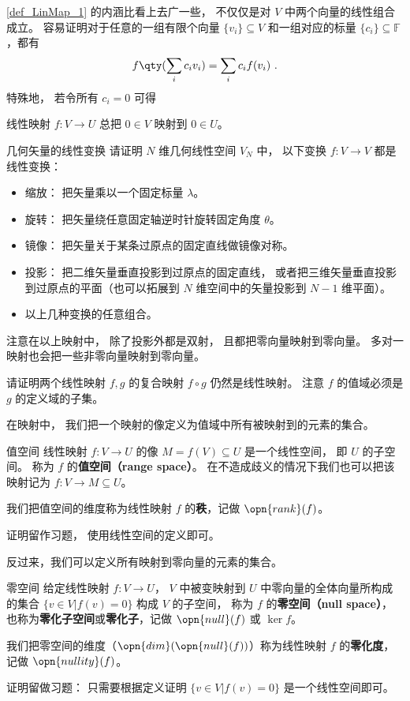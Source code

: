 \autoref{def_LinMap_1} 的内涵比看上去广一些， 不仅仅是对 $V$ 中两个向量的线性组合成立。 容易证明对于任意的一组有限个向量 $\{v_i\}\subseteq V$ 和一组对应的标量 $\{c_i\}\subseteq\mathbb{F}$，都有
\begin{equation}\label{eq_LinMap_1}
f\qty(\sum_i c_i v_i)=\sum_i c_i f(v_i)~.
\end{equation}
特殊地， 若令所有 $c_i = 0$ 可得
\begin{corollary}{}\label{cor_LinMap_1}
线性映射 $f:V\to U$ 总把 $0 \in V$ 映射到 $0 \in U$。
\end{corollary}

\begin{exercise}{几何矢量的线性变换}
请证明 $N$ 维几何线性空间 $V_N$ 中， 以下变换 $f:V\to V$ 都是线性变换：
\begin{itemize}
\item 缩放： 把矢量乘以一个固定标量 $\lambda$。
\item 旋转： 把矢量绕任意固定轴逆时针旋转固定角度 $\theta$。
\item 镜像： 把矢量关于某条过原点的固定直线做镜像对称。
\item 投影： 把二维矢量垂直投影到过原点的固定直线， 或者把三维矢量垂直投影到过原点的平面（也可以拓展到 $N$ 维空间中的矢量投影到 $N-1$ 维平面）。
\item 以上几种变换的任意组合。
\end{itemize}
\end{exercise}
注意在以上映射中， 除了投影外都是双射， 且都把零向量映射到零向量。 多对一映射也会把一些非零向量映射到零向量。

\begin{exercise}{}
请证明两个线性映射 $f, g$ 的复合映射 $f \circ g$ 仍然是线性映射。 注意 $f$ 的值域必须是 $g$ 的定义域的子集。
\end{exercise}

在映射中， 我们把一个映射的像定义为值域中所有被映射到的元素的集合。
\begin{definition}{值空间}\label{def_LinMap_3}
线性映射 $f:V\to U$ 的像 $M = f(V) \subseteq U$ 是一个线性空间， 即 $U$ 的子空间。 称为 $f$ 的\textbf{值空间（range space）}。 在不造成歧义的情况下我们也可以把该映射记为 $f: V\to M \subseteq U$。

我们把值空间的维度称为线性映射 $f$ 的\textbf{秩}，记做 $\opn{rank}(f)$。
\end{definition}
证明留作习题， 使用线性空间的定义即可。

反过来，我们可以定义所有映射到零向量的元素的集合。
\begin{definition}{零空间}\label{def_LinMap_2}
给定线性映射 $f:V\to U$， $V$ 中被变映射到 $U$ 中零向量的全体向量所构成的集合 $\{v\in V|f(v)= 0\}$ 构成 $V$ 的子空间， 称为 $f$ 的\textbf{零空间（null space）}， 也称为\textbf{零化子空间}或\textbf{零化子}，记做 $\opn{null} (f)$ 或 $\ker{f}$。

我们把零空间的维度（$\opn{dim}(\opn{null}(f))$）称为线性映射 $f$ 的\textbf{零化度}，记做 $\opn{nullity}(f)$。
\end{definition}
证明留做习题： 只需要根据定义证明 $\{v\in V|f(v)= 0\}$ 是一个线性空间即可。 

